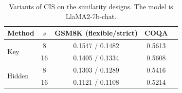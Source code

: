 \begin{table}[tb]
\centering
\footnotesize
\caption{Variants of CIS on the similarity designs. The model is LlaMA2-7b-chat.}
\label{tab:cis_variant}
{
\begin{tabular}{l|c|ccc}
\toprule
Method & $s$ & GSM8K (flexible/strict) & COQA\\ 
\midrule



\multirow{2}{*}{Key} & 8  & 0.1547 / 0.1482 & 0.5613 \\ 
 & 16  &  0.1405 / 0.1334 & 0.5608  \\ 

\midrule

\multirow{2}{*}{Hidden} &  8 & 0.1303 / 0.1289 & 0.5416  \\ 
 &  16 &  0.1121 / 0.1108 & 0.5214 \\ 

\bottomrule
\end{tabular}
}
\end{table}
